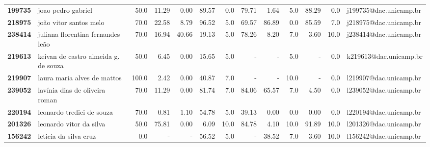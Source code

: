 \documentclass[11pt]{article}
\begin{document}
\begin{center}
\begin{landscape}
\begin{longtable}{llrrrrrrrrrrl}
\textbf{199735} &                    joao pedro gabriel &                  50.0 &       11.29 &        0.00 &       89.57 &                      0.0 &       79.71 &        1.64 &                        5.0 &       88.29 &                      0.0 &  j199735@dac.unicamp.br \\
\textbf{218975} &                joão vitor santos melo &                  70.0 &       22.58 &        8.79 &       96.52 &                      5.0 &       69.57 &       86.89 &                        0.0 &       85.59 &                      7.0 &  j218975@dac.unicamp.br \\
\textbf{238414} &     juliana florentina fernandes leão &                  70.0 &       16.94 &       40.66 &       19.13 &                      5.0 &       78.26 &        8.20 &                        7.0 &        3.60 &                     10.0 &  j238414@dac.unicamp.br \\
\textbf{219613} &  keivan de castro almeida g. de souza &                  50.0 &        6.45 &        0.00 &       15.65 &                      5.0 &           - &           - &                        5.0 &           - &                      0.0 &  k219613@dac.unicamp.br \\
\textbf{219907} &           laura maria alves de mattos &                 100.0 &        2.42 &        0.00 &       40.87 &                      7.0 &           - &           - &                       10.0 &           - &                      0.0 &  l219907@dac.unicamp.br \\
\textbf{239052} &        lavínia dias de oliveira roman &                  70.0 &       11.29 &        0.00 &       81.74 &                      7.0 &       84.06 &       65.57 &                        7.0 &        4.50 &                      0.0 &  l239052@dac.unicamp.br \\
\textbf{220194} &             leonardo tredici de souza &                  70.0 &        0.81 &        1.10 &       54.78 &                      5.0 &       39.13 &        0.00 &                        0.0 &        0.00 &                      0.0 &  l220194@dac.unicamp.br \\
\textbf{201326} &               leonardo vitor da silva &                  50.0 &       75.81 &        0.00 &        6.09 &                     10.0 &       84.78 &        4.10 &                       10.0 &       91.89 &                     10.0 &  l201326@dac.unicamp.br \\
\textbf{156242} &                 leticia da silva cruz &                   0.0 &           - &           - &       56.52 &                      5.0 &           - &       38.52 &                        7.0 &        3.60 &                     10.0 &  l156242@dac.unicamp.br \\

\end{longtable}
\end{landscape}
\end{center}
\end{document}
